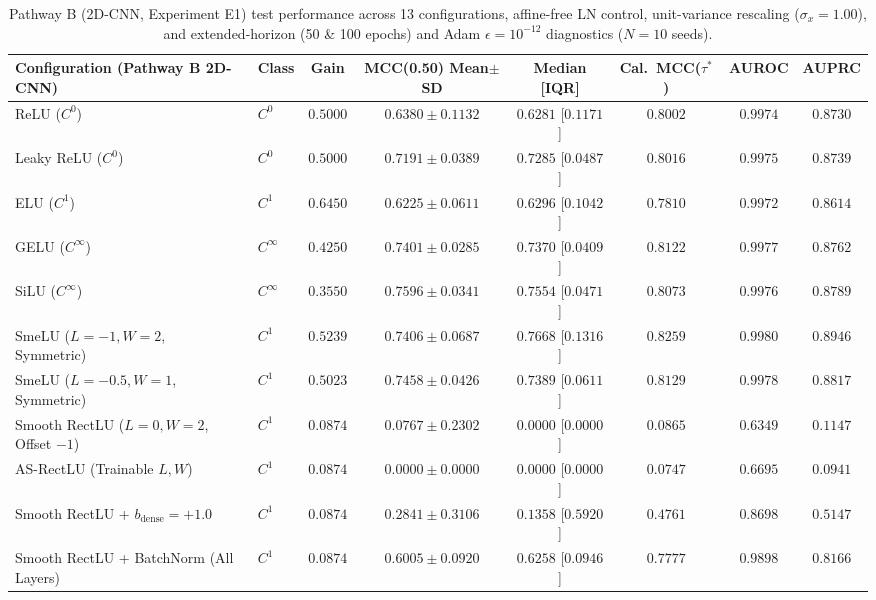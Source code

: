 \documentclass[10pt,a4paper]{article}
\begin{document}
\begin{table}[t]
\centering
\caption{Pathway B (2D-CNN, Experiment E1) test performance across 13 configurations, affine-free LN control, unit-variance rescaling ($\sigma_x=1.00$), and extended-horizon (50 \& 100 epochs) and Adam $\epsilon = 10^{-12}$ diagnostics ($N=10$ seeds).}
\label{tab:pathB}
\footnotesize
\setlength{\tabcolsep}{4.8pt}
\renewcommand{\arraystretch}{1.05}
\begin{tabular}{llcccccc}
\toprule
\textbf{Configuration (Pathway B 2D-CNN)} & \textbf{Class} & \textbf{Gain} & \textbf{MCC(0.50) Mean$\pm$SD} & \textbf{Median [IQR]} & \textbf{Cal.\ MCC($\tau^*$)} & \textbf{AUROC} & \textbf{AUPRC} \\
\midrule
ReLU ($C^0$) & $C^0$ & $0.5000$ & $0.6380 \pm 0.1132$ & $0.6281$ [$0.1171$] & $0.8002$ & $0.9974$ & $0.8730$ \\
Leaky ReLU ($C^0$) & $C^0$ & $0.5000$ & $0.7191 \pm 0.0389$ & $0.7285$ [$0.0487$] & $0.8016$ & $0.9975$ & $0.8739$ \\
ELU ($C^1$) & $C^1$ & $0.6450$ & $0.6225 \pm 0.0611$ & $0.6296$ [$0.1042$] & $0.7810$ & $0.9972$ & $0.8614$ \\
GELU ($C^\infty$) & $C^\infty$ & $0.4250$ & $0.7401 \pm 0.0285$ & $0.7370$ [$0.0409$] & $0.8122$ & $0.9977$ & $0.8762$ \\
SiLU ($C^\infty$) & $C^\infty$ & $0.3550$ & $0.7596 \pm 0.0341$ & $0.7554$ [$0.0471$] & $0.8073$ & $0.9976$ & $0.8789$ \\
SmeLU ($L=-1, W=2$, Symmetric)~\cite{shamir2020} & $C^1$ & $0.5239$ & $0.7406 \pm 0.0687$ & $0.7668$ [$0.1316$] & $0.8259$ & $\mathbf{0.9980}$ & $0.8946$ \\
SmeLU ($L=-0.5, W=1$, Symmetric)~\cite{shamir2020} & $C^1$ & $0.5023$ & $0.7458 \pm 0.0426$ & $0.7389$ [$0.0611$] & $0.8129$ & $0.9978$ & $0.8817$ \\
Smooth RectLU ($L=0, W=2$, Offset $-1$) & $C^1$ & $0.0874$ & $0.0767 \pm 0.2302$ & $0.0000$ [$0.0000$] & $0.0865$ & $0.6349$ & $0.1147$ \\
AS-RectLU (Trainable $L, W$) & $C^1$ & $0.0874$ & $0.0000 \pm 0.0000$ & $0.0000$ [$0.0000$] & $0.0747$ & $0.6695$ & $0.0941$ \\
Smooth RectLU + $b_{\text{dense}} = +1.0$ & $C^1$ & $0.0874$ & $0.2841 \pm 0.3106$ & $0.1358$ [$0.5920$] & $0.4761$ & $0.8698$ & $0.5147$ \\
Smooth RectLU + BatchNorm (All Layers) & $C^1$ & $0.0874$ & $0.6005 \pm 0.0920$ & $0.6258$ [$0.0946$] & $0.7777$ & $0.9898$ & $0.8166$ \\

\end{tabular}
\end{table}
\end{document}
